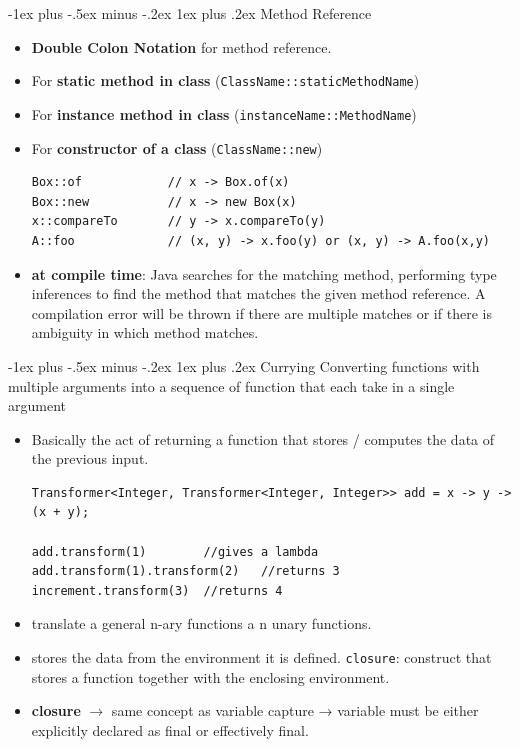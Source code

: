 \documentclass[12pt, landscape]{article}
\makeatletter
\newcommand{\code}[1]{\colorbox{gray!25!}{\lstinline|#1|}}
\renewcommand{\subsubsection}{\@startsection{subsubsection}{3}{0.1mm}%
                                {-1ex plus -.5ex minus -.2ex}%
                                {1ex plus .2ex}%
                                {\normalfont\small\bfseries}}
\makeatother
\begin{document}
\begin{multicols*}{3}
\subsubsection{Method Reference}
\begin{itemize}
\item \textbf{Double Colon Notation} for method reference.
\item For \textbf{static method in class} (\code{ClassName::staticMethodName})
\item For \textbf{instance method in class} (\code{instanceName::MethodName})
\item For \textbf{constructor of a class} (\code{ClassName::new})

\begin{lstlisting}
Box::of            // x -> Box.of(x)
Box::new           // x -> new Box(x)
x::compareTo       // y -> x.compareTo(y)
A::foo             // (x, y) -> x.foo(y) or (x, y) -> A.foo(x,y)
\end{lstlisting}

\item \textbf{at compile time}: Java searches for the matching method, performing type inferences to find the method that matches the given method reference. A compilation error will be thrown if there are multiple matches or if there is ambiguity in which method matches.
\end{itemize}

\subsubsection{Currying}
 Converting functions with multiple arguments into a sequence of function that each take in a single argument 
\begin{itemize}
\item Basically the act of returning a function that stores / computes the data of the previous input.
\begin{lstlisting}
Transformer<Integer, Transformer<Integer, Integer>> add = x -> y -> (x + y);
	
add.transform(1)		//gives a lambda
add.transform(1).transform(2)	//returns 3
increment.transform(3)	//returns 4
\end{lstlisting}

\item translate a general n-ary functions a n unary functions.
\item stores the data from the environment it is defined. \code{closure}: construct that stores a function together with the enclosing environment.
\item \textbf{closure} $\rightarrow$ same concept as variable capture → variable must be either explicitly declared as final or effectively final.
\end{itemize}



\end{multicols*}
\end{document}

